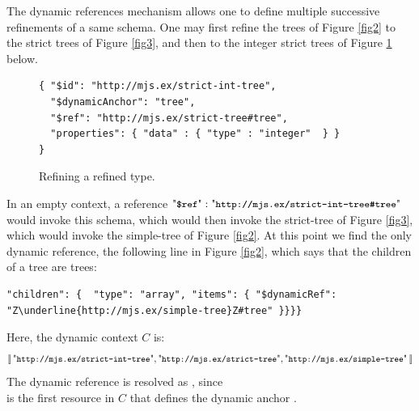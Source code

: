 \begin{example}
The dynamic references mechanism allows one to define multiple successive refinements of a same schema.
One may first refine the trees of Figure \ref{fig2} to the strict trees of Figure \ref{fig3}, and then to the
integer strict trees of Figure \ref{strict-int-trees} below.

\begin{figure}[htb!]
\begin{querybox}{}
\begin{lstlisting}[style=query,escapechar=Z]
{ "$id": "http://mjs.ex/strict-int-tree",
  "$dynamicAnchor": "tree",
  "$ref": "http://mjs.ex/strict-tree#tree",
  "properties": { "data" : { "type" : "integer"  } } 
}
\end{lstlisting}
\end{querybox}
\caption{Refining a refined type.}\label{strict-int-trees}
\end{figure}

In an empty context, a reference $\qdref: \qkw{http://mjs.ex/strict-int-tree\#tree}$ would invoke this schema, which
would then invoke the strict-tree of Figure \ref{fig3}, which would invoke the simple-tree of Figure \ref{fig2}.
At this point we find the only dynamic reference, the following line in Figure \ref{fig2}, which says that the
children of a tree are trees:
\begin{querybox}{}
\begin{lstlisting}[style=query,escapechar=Z]
    "children": {  "type": "array", "items": { "$dynamicRef": "Z\underline{http://mjs.ex/simple-tree}Z#tree" }}}}
\end{lstlisting}
\end{querybox}

Here, the dynamic context $C$ is:
{\small
\[
\List{\qkw{http://mjs.ex/strict-int-tree},\qkw{http://mjs.ex/strict-tree},\qkw{http://mjs.ex/simple-tree}}
\]}
The dynamic reference is resolved as , since\\
 is the first resource in $C$ that defines
the dynamic anchor .
\end{example}


